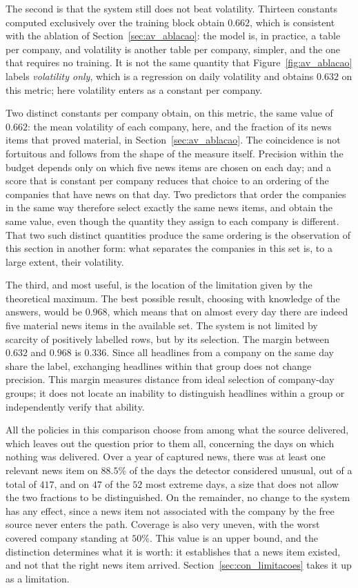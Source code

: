 The second is that the system still does not beat volatility. Thirteen constants computed
exclusively over the training block obtain $0.662$, which is consistent with the ablation of
Section~\ref{sec:av_ablacao}: the model is, in practice, a table per company, and volatility is
another table per company, simpler, and the one that requires no training. It is not the same
quantity that Figure~\ref{fig:av_ablacao} labels \emph{volatility only}, which is a regression on daily
volatility and obtains $0.632$ on this metric; here volatility enters as a constant per
company.

Two distinct constants per company obtain, on this metric, the same value of $0.662$: the mean
volatility of each company, here, and the fraction of its news items that proved material, in
Section~\ref{sec:av_ablacao}. The coincidence is not fortuitous and follows from the shape of the
measure itself. Precision within the budget depends only on which five news items are chosen on
each day; and a score that is constant per company reduces that choice to an ordering of the
companies that have news on that day. Two predictors that order the companies in the same way
therefore select exactly the same news items, and obtain the same value, even though the quantity
they assign to each company is different. That two such distinct quantities produce the same
ordering is the observation of this section in another form: what separates the companies in this
set is, to a large extent, their volatility.

The third, and most useful, is the location of the limitation given by the theoretical maximum. The
best possible result, choosing with knowledge of the answers, would be $0.968$, which means that on
almost every day there are indeed five material news items in the available set. The system is not
limited by scarcity of positively labelled rows, but by its selection. The margin between
$0.632$ and $0.968$ is $0.336$. Since all headlines from a company on the same day share the
label, exchanging headlines within that group does not change precision. This margin measures
distance from ideal selection of company-day groups; it does not locate an inability to
distinguish headlines within a group or independently verify that ability.

All the policies in this comparison choose from among what the source delivered, which leaves out
the question prior to them all, concerning the days on which nothing was delivered. Over a year of
captured news, there was at least one relevant news item on $88.5\%$ of the days the detector
considered unusual, out of a total of $417$, and on $47$ of the $52$ most extreme days, a size that
does not allow the two fractions to be distinguished. On the remainder, no change to the system has
any effect, since a news item not associated with the company by the free source never enters the
path. Coverage is also very uneven, with the worst covered company standing at $50\%$. This value
is an upper bound, and the distinction determines what it is worth: it establishes that a news item
existed, and not that the right news item arrived. Section~\ref{sec:con_limitacoes} takes it up as
a limitation.

